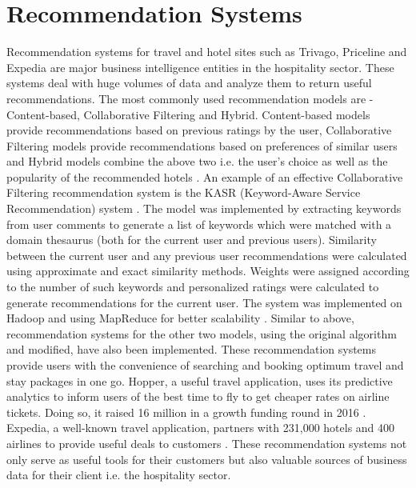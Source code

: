 \documentclass[sigconf]{acmart}
\begin{document}
\section{Recommendation Systems}
Recommendation systems for travel and hotel sites such as Trivago, Priceline and Expedia are major business intelligence entities in the hospitality sector. These systems deal with huge volumes of data and analyze them to return useful recommendations. The most commonly used recommendation models are - Content-based, Collaborative Filtering and Hybrid. Content-based models provide recommendations based on previous ratings by the user, Collaborative Filtering models provide recommendations based on preferences of similar users and Hybrid models combine the above two i.e. the user's choice as well as the popularity of the recommended hotels \cite {kasr11}.
\newline An example of an effective Collaborative Filtering recommendation system is the KASR (Keyword-Aware Service Recommendation) system \cite {kasr11}. The model was implemented by extracting keywords from user comments to generate a list of keywords which were matched with a domain thesaurus (both for the current user and previous users). Similarity between the current user and any previous user recommendations were calculated using approximate and exact similarity methods. Weights were assigned according to the number of such keywords and personalized ratings were calculated to generate recommendations for the current user. The system was implemented on Hadoop and using MapReduce for better scalability \cite {kasr11}.
\newline Similar to above, recommendation systems for the other two models, using the original algorithm and modified, have also been implemented. These recommendation systems provide users with the convenience of searching and booking optimum travel and stay packages in one go. Hopper, a useful travel application, uses its predictive analytics to inform users of the best time to fly to get cheaper rates on airline tickets. Doing so, it raised 16 million in a growth funding round in 2016 \cite {hopper1613}. Expedia, a well-known travel application, partners with 231,000 hotels and 400 airlines to provide useful deals to customers \cite {expediahopperskyscanner13}. These recommendation systems not only serve as useful tools for their customers but also valuable sources of business data for their client i.e. the hospitality sector.
\end{document}

